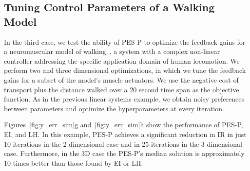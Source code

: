 \subsection{Tuning Control Parameters of a Walking Model
    }\label{sec:sim_neuro}
In the third case, we test the ability of PES-P to optimize the feedback gains
for a neuromuscular model of walking~\citep{thatte2016toward}, a system with a
complex non-linear controller addressing the specific application domain of
human locomotion. We perform two and three dimensional optimizations, in which
we tune the feedback gains for a subset of the model's muscle actuators.  We use
the negative cost of transport plus the distance walked over a 20 second time
span as the objective function. As in the previous linear systems example, we
obtain noisy preferences between parameters and optimize the hyperparameters at
every iteration.

Figures~\ref{fig:y_err_sim}g and~\ref{fig:y_err_sim}h show the performance of
PES-P, EI, and LH\@. In this example, PES-P achieves a significant reduction in
IR in just 10 iterations in the 2-dimensional case and in 25 iterations in the 3
dimensional case.  Furthermore, in the 3D case the PES-P's median solution is
approximately 10 times better than those found by EI or LH\@. 
